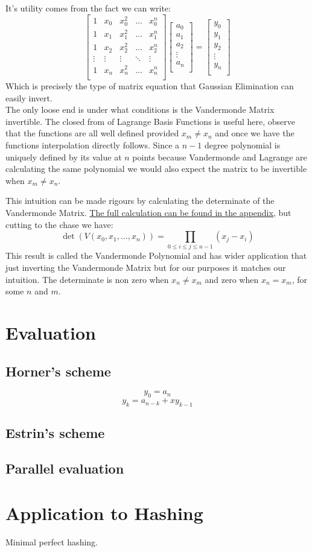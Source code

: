 It's utility comes from the fact we can write:
\[
\begin{bmatrix} 
	1&x_0&x_0^2&\dots&x_0^n \\
	1&x_1&x_1^2&\dots&x_1^n \\
	1&x_2&x_2^2&\dots&x_2^n \\
	\vdots&\vdots&\vdots&\ddots&\vdots \\
	1&x_n&x_n^2&\dots&x_n^n \\
\end{bmatrix}
\begin{bmatrix}
	a_0\\a_1\\a_2\\\vdots\\a_n\\
\end{bmatrix}
=
\begin{bmatrix}
	y_0\\y_1\\y_2\\\vdots\\y_n\\
\end{bmatrix}
\]
Which is precisely the type of matrix equation that Gaussian Elimination can easily invert.
\\

The only loose end is under what conditions is the Vandermonde Matrix invertible.
The closed from of Lagrange Basis Functions is useful here,
observe that the functions are all well defined provided $x_m \neq x_n$ and once we have the functions interpolation directly follows.
Since a $n-1$ degree polynomial is uniquely defined by its value at $n$ points because Vandermonde and Lagrange are calculating the same polynomial we would also expect the matrix to be invertible when $x_m \neq x_n$.

This intuition can be made rigours by calculating the determinate of the Vandermonde Matrix.
\hyperref[appx:laplace-expansion]{The full calculation can be found in the appendix,}
but cutting to the chase we have:
\[\det(V(x_0,x_1,\dots,x_n)) = \prod_{0\leq i \leq j \leq n-1}(x_j-x_i)\]
This result is called the Vandermonde Polynomial and has wider application that just inverting the Vandermonde Matrix but for our purposes it matches our intuition.
The determinate is non zero when $x_n\neq x_m$ and zero when $x_n=x_m$, for some $n$ and $m$.
\section{Evaluation}
\subsection{Horner's scheme}
\[y_0 = a_n\]
\[y_k = a_{n-k}+xy_{k-1}\]
\subsection{Estrin's scheme}
\subsection{Parallel evaluation}
\section{Application to Hashing}
Minimal perfect hashing.
